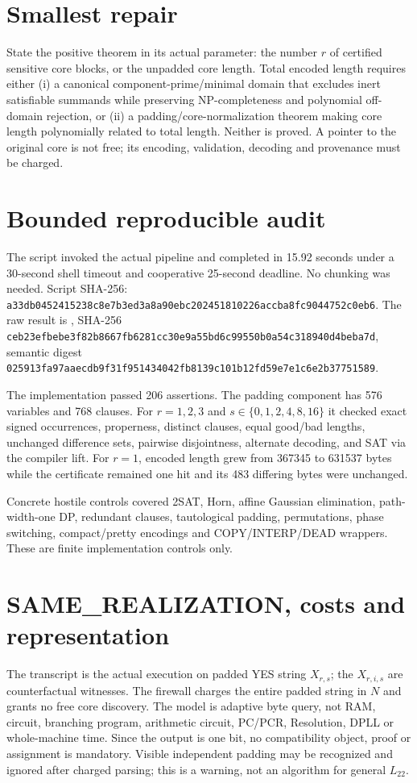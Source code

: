 \documentclass[11pt]{article}
\newcommand{\Ltwo}{L_{22}}
\begin{document}
\section{Smallest repair}
State the positive theorem in its actual parameter: the number $r$ of
certified sensitive core blocks, or the unpadded core length.  Total encoded
length requires either (i) a canonical component-prime/minimal domain that
excludes inert satisfiable summands while preserving NP-completeness and
polynomial off-domain rejection, or (ii) a padding/core-normalization theorem
making core length polynomially related to total length.  Neither is proved.
A pointer to the original core is not free; its encoding, validation,
decoding and provenance must be charged.

\section{Bounded reproducible audit}
The script
 invoked the actual
 pipeline and completed in 15.92
seconds under a 30-second shell timeout and cooperative 25-second deadline.
No chunking was needed. Script SHA-256:
\texttt{a33db0452415238c8e7b3ed3a8a90ebc202451810226accba8fc9044752c0eb6}.
The raw result is
,
SHA-256
\texttt{ceb23efbebe3f82b8667fb6281cc30e9a55bd6c99550b0a54c318940d4beba7d},
semantic digest
\texttt{025913fa97aaecdb9f31f951434042fb8139c101b12fd59e7e1c6e2b37751589}.

The implementation passed 206 assertions. The padding component has 576
variables and 768 clauses. For $r=1,2,3$ and
$s\in\{0,1,2,4,8,16\}$ it checked exact signed occurrences, properness,
distinct clauses, equal good/bad lengths, unchanged difference sets, pairwise
disjointness, alternate decoding, and SAT via the compiler lift. For $r=1$,
encoded length grew from 367345 to 631537 bytes while the certificate remained
one hit and its 483 differing bytes were unchanged.

Concrete hostile controls covered 2SAT, Horn, affine Gaussian elimination,
path-width-one DP, redundant clauses, tautological padding, permutations,
phase switching, compact/pretty encodings and COPY/INTERP/DEAD wrappers.
These are finite implementation controls only.

\section{SAME\_REALIZATION, costs and representation}
The transcript is the actual execution on padded YES string $X_{r,s}$; the
$X_{r,i,s}$ are counterfactual witnesses. The firewall charges the entire
padded string in $N$ and grants no free core discovery. The model is adaptive
byte query, not RAM, circuit, branching program, arithmetic circuit, PC/PCR,
Resolution, DPLL or whole-machine time. Since the output is one bit, no
compatibility object, proof or assignment is mandatory. Visible independent
padding may be recognized and ignored after charged parsing; this is a
warning, not an algorithm for general \(\Ltwo\).
\end{document}

